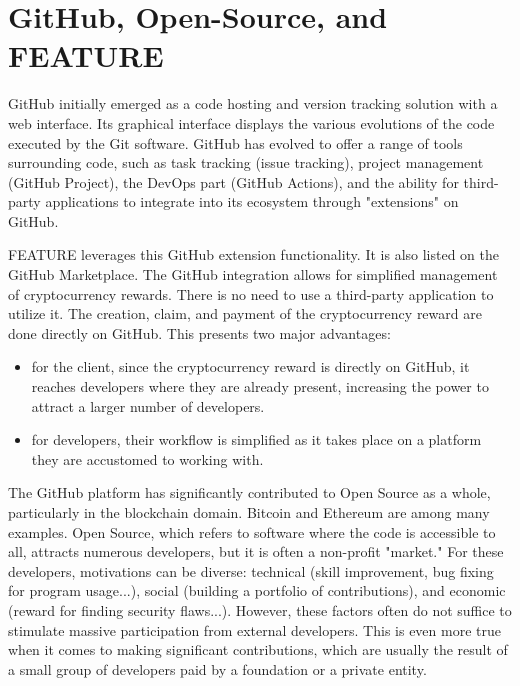 \documentclass[
	a4paper, %
	10pt, %
	unnumberedsections, %
	twoside, %
]{LTJournalArticle}
\begin{document}

\section{GitHub, Open-Source, and FEATURE}

GitHub initially emerged as a code hosting and version tracking solution with a web interface. Its graphical interface displays the various evolutions of the code executed by the Git software. GitHub has evolved to offer a range of tools surrounding code, such as task tracking (issue tracking), project management (GitHub Project), the DevOps part (GitHub Actions), and the ability for third-party applications to integrate into its ecosystem through "extensions" on GitHub.

FEATURE leverages this GitHub extension functionality. It is also listed on the GitHub Marketplace. The GitHub integration allows for simplified management of cryptocurrency rewards. There is no need to use a third-party application to utilize it. The creation, claim, and payment of the cryptocurrency reward are done directly on GitHub. This presents two major advantages:
\begin{itemize}
\item
  for the client, since the cryptocurrency reward is directly on GitHub, it reaches developers where they are already present, increasing the power to attract a larger number of developers.
\item
  for developers, their workflow is simplified as it takes place on a platform they are accustomed to working with.
\end{itemize}

The GitHub platform has significantly contributed to Open Source as a whole, particularly in the blockchain domain. Bitcoin and Ethereum are among many examples. Open Source, which refers to software where the code is accessible to all, attracts numerous developers, but it is often a non-profit "market." For these developers, motivations can be diverse: technical (skill improvement, bug fixing for program usage...), social (building a portfolio of contributions), and economic (reward for finding security flaws...). However, these factors often do not suffice to stimulate massive participation from external developers. This is even more true when it comes to making significant contributions, which are usually the result of a small group of developers paid by a foundation or a private entity.
\end{document}
